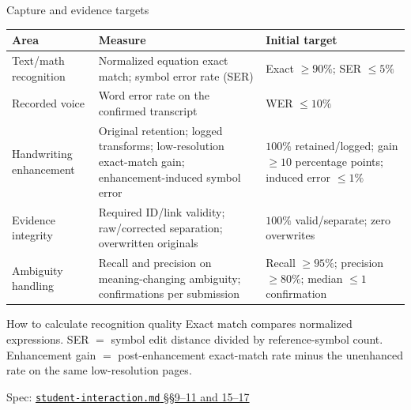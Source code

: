 \documentclass[aspectratio=169,10pt]{beamer}
\newcommand{\specnote}[2]{%
  \vfill\hfill{\tiny\color{Muted}Spec: \href{run:../../specs/#1}{\texttt{#1} #2}}}
\begin{document}
\begin{frame}{Capture and evidence targets}
\footnotesize
\begin{tabularx}{\textwidth}{@{}P{.24\textwidth}Y P{.25\textwidth}@{}}
\toprule
\textbf{Area} & \textbf{Measure} & \textbf{Initial target} \\
\midrule
Text/math recognition & Normalized equation exact match; symbol error rate (SER) & Exact $\geq90\%$; SER $\leq5\%$ \\
Recorded voice & Word error rate on the confirmed transcript & WER $\leq10\%$ \\
Handwriting enhancement & Original retention; logged transforms; low-resolution exact-match gain; enhancement-induced symbol error & $100\%$ retained/logged; gain $\geq10$ percentage points; induced error $\leq1\%$ \\
Evidence integrity & Required ID/link validity; raw/corrected separation; overwritten originals & $100\%$ valid/separate; zero overwrites \\
Ambiguity handling & Recall and precision on meaning-changing ambiguity; confirmations per submission & Recall $\geq95\%$; precision $\geq80\%$; median $\leq1$ confirmation \\
\bottomrule
\end{tabularx}
\vspace{.2em}
\begin{block}{How to calculate recognition quality}
Exact match compares normalized expressions. SER $=$ symbol edit distance divided by reference-symbol count. Enhancement gain $=$ post-enhancement exact-match rate minus the unenhanced rate on the same low-resolution pages.
\end{block}
\specnote{student-interaction.md}{\S\S9--11 and 15--17}
\end{frame}
\end{document}
